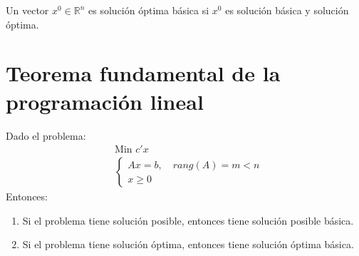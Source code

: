 \begin{definition}
    Un vector $x^0 \in \mathbb{R}^n$ es solución óptima básica si $x^0$ es solución básica y solución óptima.
\end{definition}

\section{Teorema fundamental de la programación lineal}
\begin{theorem}
    Dado el problema:
    \begin{align*}
         & \text{Min } c'x               \\
         & \begin{cases}
               Ax = b, \quad rang(A) = m < n \\
               x \geq 0
           \end{cases}
    \end{align*}
    Entonces:
    \begin{enumerate}
        \item Si el problema tiene solución posible, entonces tiene solución posible básica.
        \item Si el problema tiene solución óptima, entonces tiene solución óptima básica.
    \end{enumerate}
\end{theorem}


